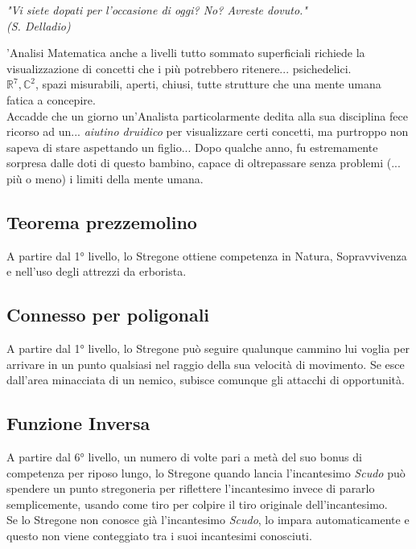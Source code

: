 \begin{DndReadAloud}
  \it
  "Vi siete dopati per l'occasione di oggi? No? Avreste dovuto." \\ (S. Delladio)
\end{DndReadAloud}

'Analisi Matematica anche a livelli tutto sommato superficiali richiede la visualizzazione di concetti che i più potrebbero ritenere... psichedelici. \\ \begin{math} \mathbb{R}^7, \mathbb{C}^2\end{math}, spazi misurabili, aperti, chiusi, tutte strutture che una mente umana fatica a concepire. \\ Accadde che un giorno un'Analista particolarmente dedita alla sua disciplina fece ricorso ad un... \textit{aiutino druidico} per visualizzare certi concetti, ma purtroppo non sapeva di stare aspettando un figlio... Dopo qualche anno, fu estremamente sorpresa dalle doti di questo bambino, capace di oltrepassare senza problemi (... più o meno) i limiti della mente umana.

\subsection{Teorema prezzemolino}

A partire dal 1° livello, lo Stregone ottiene competenza in Natura, Sopravvivenza e nell'uso degli attrezzi da erborista.

\subsection{Connesso per poligonali}

A partire dal 1° livello, lo Stregone può seguire qualunque cammino lui voglia per arrivare in un punto qualsiasi nel raggio della sua velocità di movimento. Se esce dall'area minacciata di un nemico, subisce comunque gli attacchi di opportunità.

\subsection{Funzione Inversa}

A partire dal 6° livello, un numero di volte pari a metà del suo bonus di competenza per riposo lungo, lo Stregone quando lancia l'incantesimo \textit{Scudo} può spendere un punto stregoneria per riflettere l'incantesimo invece di pararlo semplicemente, usando come tiro per colpire il tiro originale dell'incantesimo. \\ Se lo Stregone non conosce già l'incantesimo \textit{Scudo}, lo impara automaticamente e questo non viene conteggiato tra i suoi incantesimi conosciuti.

